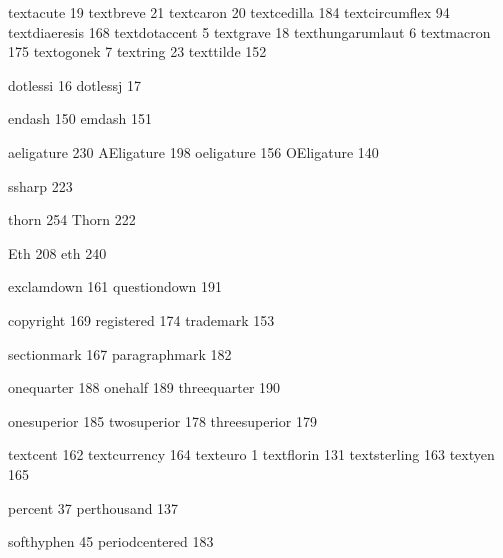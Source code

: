 
\stopmapping

\startencoding[texnansi]

 textacute         19
 textbreve         21
 textcaron         20
 textcedilla      184
 textcircumflex    94 %
 textdiaeresis    168
 textdotaccent      5
 textgrave         18
 texthungarumlaut   6
 textmacron       175
 textogonek         7
 textring          23
 texttilde        152

 dotlessi          16 %
 dotlessj          17

 endash           150 %
 emdash           151 %

 aeligature       230
 AEligature       198
 oeligature       156
 OEligature       140

 ssharp           223

 thorn            254
 Thorn            222

 Eth              208
 eth              240

 exclamdown       161
 questiondown     191

 copyright        169
 registered       174
 trademark        153

 sectionmark      167
 paragraphmark    182

 onequarter       188
 onehalf          189
 threequarter     190

 onesuperior      185
 twosuperior      178
 threesuperior    179

 textcent         162 %
 textcurrency     164
 texteuro           1
 textflorin       131
 textsterling     163
 textyen          165

 percent           37
 perthousand      137

 softhyphen        45
 periodcentered   183


